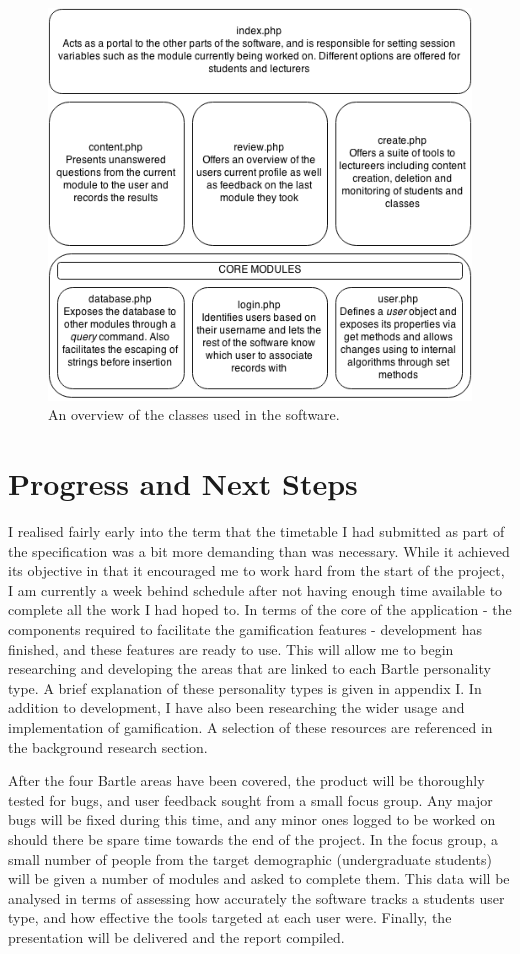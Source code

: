 \documentclass[10pt,a4paper]{report}
\begin{document}
\begin{figure}
	\includegraphics[width=\textwidth]{../img/classes.png}
	\caption{An overview of the classes used in the software.}
	\label{classes}
\end{figure}

\section*{Progress and Next Steps}
I realised fairly early into the term that the timetable I had submitted as part of the specification was a bit more demanding than was necessary. While it achieved its objective in that it encouraged me to work hard from the start of the project, I am currently a week behind schedule after not having enough time available to complete all the work I had hoped to. In terms of the core of the application - the components required to facilitate the gamification features - development has finished, and these features are ready to use. This will allow me to begin researching and developing the areas that are linked to each Bartle personality type. A brief explanation of these personality types is given in appendix I. In addition to development, I have also been researching the wider usage and implementation of gamification. A selection of these resources are referenced in the background research section.

After the four Bartle areas have been covered, the product will be thoroughly tested for bugs, and user feedback sought from a small focus group. Any major bugs will be fixed during this time, and any minor ones logged to be worked on should there be spare time towards the end of the project. In the focus group, a small number of people from the target demographic (undergraduate students) will be given a number of modules and asked to complete them. This data will be analysed in terms of assessing how accurately the software tracks a students user type, and how effective the tools targeted at each user were. Finally, the presentation will be delivered and the report compiled. 
\end{document}

